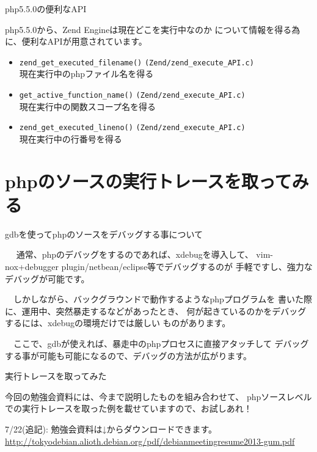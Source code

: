 \begin{frame}[containsverbatim]{php5.5.0の便利なAPI}

 php5.5.0から、Zend Engineは現在どこを実行中なのか
について情報を得る為に、便利なAPIが用意されています。

\begin{itemize}
\item \verb+zend_get_executed_filename()+ \verb+(Zend/zend_execute_API.c)+ \\
  現在実行中のphpファイル名を得る
\item \verb+get_active_function_name()+ \verb+(Zend/zend_execute_API.c)+ \\
  現在実行中の関数スコープ名を得る
\item \verb+zend_get_executed_lineno()+ \verb+(Zend/zend_execute_API.c)+ \\
  現在実行中の行番号を得る
\end{itemize}
\end{frame}

\section{phpのソースの実行トレースを取ってみる}

\begin{frame}{gdbを使ってphpのソースをデバッグする事について}

　 通常、phpのデバッグをするのであれば、xdebugを導入して、
vim-nox+debugger plugin/netbean/eclipse等でデバッグするのが
手軽ですし、強力なデバッグが可能です。

　しかしながら、バックグラウンドで動作するようなphpプログラムを
書いた際に、運用中、突然暴走するなどがあったとき、
何が起きているのかをデバッグするには、xdebugの環境だけでは厳しい
ものがあります。

　ここで、gdbが使えれば、暴走中のphpプロセスに直接アタッチして
デバッグする事が可能も可能になるので、デバッグの方法が広がります。

\end{frame}


\begin{frame}{実行トレースを取ってみた}

 今回の勉強会資料には、今まで説明したものを組み合わせて、
phpソースレベルでの実行トレースを取った例を載せていますので、お試しあれ！

 7/22(追記): 勉強会資料は↓からダウンロードできます。
 \url{http://tokyodebian.alioth.debian.org/pdf/debianmeetingresume2013-gum.pdf}
\end{frame}

